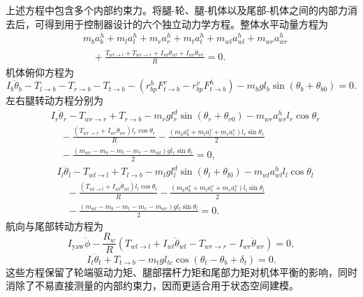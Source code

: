 \documentclass[type=bachelor]{bithesis}
\begin{document}
上述方程中包含多个内部约束力。将腿-轮、腿-机体以及尾部-机体之间的内部力消去后，可得到用于控制器设计的六个独立动力学方程。整体水平动量方程为
\begin{equation}
\begin{aligned}
  &m_ba_b^h+m_la_l^h+m_ra_r^h+m_ta_t^h
  +m_{wl}a_{wl}^h+m_{wr}a_{wr}^h \\
  &\quad
  +\frac{T_{wl\to l}+T_{wr\to r}
  +I_{wl}\ddot{\theta}_{wl}+I_{wr}\ddot{\theta}_{wr}}{R}=0 .
\end{aligned}
\end{equation}
机体俯仰方程为
\begin{equation}
  I_b\ddot{\theta}_b-T_{l\to b}-T_{r\to b}-T_{t\to b}
  -(r_{bp}^hF_{t\to b}^v-r_{bp}^vF_{t\to b}^h)
  -m_bgl_b\sin(\theta_b+\theta_{b0})=0 .
\end{equation}
左右腿转动方程分别为
\begin{equation}
\begin{aligned}
  &I_r\ddot{\theta}_r-T_{wr\to r}+T_{r\to b}
  -m_rgl_r^d\sin(\theta_r+\theta_{r0})
  -m_{wr}a_{wr}^hl_r\cos\theta_r\\
  &\quad
  -\frac{(T_{wr\to r}+I_{wr}\ddot{\theta}_{wr})l_r\cos\theta_r}{R}
  -\frac{(m_ba_b^v+m_la_l^v+m_ra_r^v)l_r\sin\theta_r}{2}\\
  &\quad
  -\frac{(m_{wr}-m_b-m_l-m_r-m_{wl})gl_r\sin\theta_r}{2}=0,
\end{aligned}
\end{equation}
\begin{equation}
\begin{aligned}
  &I_l\ddot{\theta}_l-T_{wl\to l}+T_{l\to b}
  -m_lgl_l^d\sin(\theta_l+\theta_{l0})
  -m_{wl}a_{wl}^hl_l\cos\theta_l\\
  &\quad
  -\frac{(T_{wl\to l}+I_{wl}\ddot{\theta}_{wl})l_l\cos\theta_l}{R}
  -\frac{(m_ba_b^v+m_la_l^v+m_ra_r^v)l_l\sin\theta_l}{2}\\
  &\quad
  -\frac{(m_{wl}-m_b-m_l-m_r-m_{wr})gl_l\sin\theta_l}{2}=0 .
\end{aligned}
\end{equation}
航向与尾部转动方程为
\begin{equation}
  I_{\mathrm{yaw}}\ddot{\phi}
  -\frac{R_w}{R}
  (T_{wl\to l}+I_{wl}\ddot{\theta}_{wl}
  -T_{wr\to r}-I_{wr}\ddot{\theta}_{wr})=0,
\end{equation}
\begin{equation}
  I_t\ddot{\theta}_t+T_{t\to b}
  -m_tgl_{tc}\cos(\theta_t-\theta_b+\delta_t)=0 .
\end{equation}
这些方程保留了轮端驱动力矩、腿部摆杆力矩和尾部力矩对机体平衡的影响，同时消除了不易直接测量的内部约束力，因而更适合用于状态空间建模。
\end{document}
